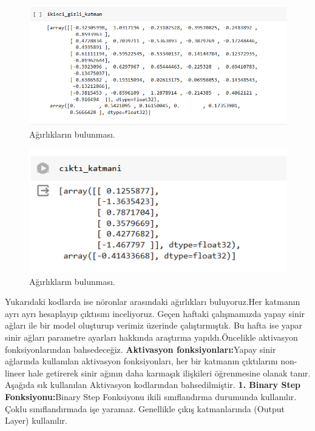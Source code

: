 \documentclass[12pt, a4paper]{article}
\begin{document}
	\begin{figure}[!h]
		\centering
		\includegraphics{5.10.png}
		\caption{Ağırlıkların bulunması.}
	\end{figure}
	\newpage
	\begin{figure}[!h]
		\centering
		\includegraphics{5.11.png}
		\caption{Ağırlıkların bulunması.}
	\end{figure}
	Yukarıdaki kodlarda ise nöronlar arasındaki ağırlıkları buluyoruz.Her katmanın ayrı ayrı hesaplayıp çıktısını inceliyoruz.\cite{youtube-ysa}
	Geçen haftaki çalışmamızda yapay sinir ağları ile bir model oluşturup verimiz üzerinde çalıştırmıştık. Bu hafta ise yapar sinir ağları parametre ayarları hakkında araştırma yapıldı.Öncelikle aktivasyon fonksiyonlarından bahsedeceğiz.
	\newline \textbf{Aktivasyon fonksiyonları:}Yapay sinir ağlarında kullanılan aktivasyon fonksiyonları, her bir katmanın çıktılarını non-lineer hale getirerek sinir ağının daha karmaşık ilişkileri öğrenmesine olanak tanır.
	Aşağıda sık kullanılan Aktivasyon kodlarından bahsedilmiştir.
	\newline 
	\newline \textbf{1. Binary Step Fonksiyonu:}Binary Step Fonksiyonu ikili sınıflandırma durumunda kullanılır. Çoklu sınıflandırmada işe yaramaz. Genellikle çıkış katmanlarında (Output Layer) kullanılır.
\end{document}
